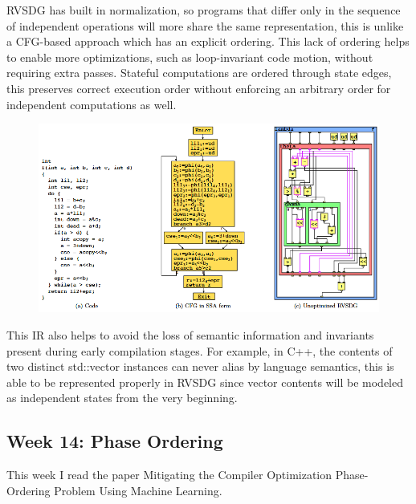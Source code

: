 \documentclass[11pt, a4paper, titlepage]{article}
\begin{document}
RVSDG has built in normalization, so programs that differ only in the sequence of independent operations will more share the same representation, this is unlike a CFG-based approach which has an explicit ordering. This lack of ordering helps to enable more optimizations, such as loop-invariant code motion, without requiring extra passes. Stateful computations are ordered through state edges, this preserves correct execution order without enforcing an arbitrary order for independent computations as well.

\begin{figure}[H]
  \centering
  \includegraphics[scale=0.4]{images/r23.png}
\end{figure}

This IR also helps to avoid the loss of semantic information and invariants present during early compilation stages. For example, in C++, the contents of two distinct std::vector instances can never alias by language semantics, this is able to be represented properly in RVSDG since vector contents will be modeled as independent states from the very beginning.

\subsection{Week 14: Phase Ordering }

This week I read the paper Mitigating the Compiler Optimization Phase-Ordering Problem Using Machine Learning.
\end{document}
